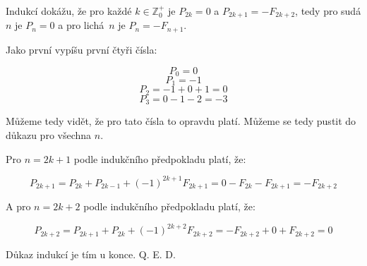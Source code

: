 \documentclass{fkssolpub}
\author{Ondřej Sedláček}
\begin{document}
  Indukcí dokážu, že pro každé $k \in \mathbb{Z}_{0}^{+}$ je $P_{2k} = 0$ a $P_{2k + 1} = -F_{2k + 2}$, tedy pro sudá $n$ je $P_n = 0$ a pro lichá~$n$ je $P_n = -F_{n + 1}$.

Jako první vypíšu první čtyři čísla:

\[
  P_0 = 0
\]
\[
  P_1 = -1
\]
\[
  P_2 = -1 + 0 + 1 = 0
\]
\[
  P_3 = 0 -1 - 2 = -3
\]

Můžeme tedy vidět, že pro tato čísla to opravdu platí. Můžeme se tedy pustit do důkazu pro všechna $n$.

Pro $n = 2k + 1$ podle indukčního předpokladu platí, že:

\[
  P_{2k + 1} = P_{2k} + P_{2k - 1} + (-1)^{2k + 1} F_{2k + 1} = 0 - F_{2k} - F_{2k + 1} = - F_{2k + 2}
\]

A pro $n = 2k + 2$ podle indukčního předpokladu platí, že:

\[
  P_{2k + 2} = P_{2k + 1} + P_{2k} + (-1)^{2k + 2} F_{2k + 2} = - F_{2k + 2} + 0 + F_{2k + 2} = 0
\]

Důkaz indukcí je tím u konce. Q. E. D.
\end{document}
